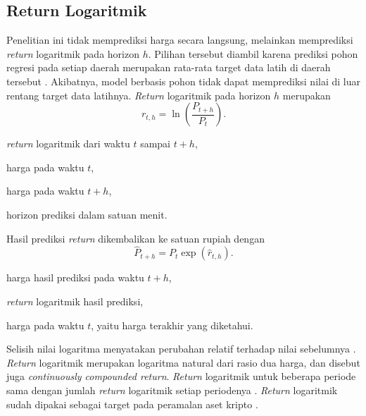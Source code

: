 \subsection{Return Logaritmik}
\label{subsec:return}
Penelitian ini tidak memprediksi harga secara langsung, melainkan memprediksi
\textit{return} logaritmik pada horizon $h$. Pilihan tersebut diambil karena
prediksi pohon regresi pada setiap daerah merupakan rata-rata target data latih
di daerah tersebut \cite{hastie2009}. Akibatnya, model berbasis pohon tidak
dapat memprediksi nilai di luar rentang target data latihnya.
\textit{Return} logaritmik pada horizon $h$ merupakan
\begin{equation}
  r_{t,h} = \ln\!\left(\frac{P_{t+h}}{P_t}\right).
  \label{eq:return}
\end{equation}
\begin{keterangan}
  \item[$r_{t,h}$] \textit{return} logaritmik dari waktu $t$ sampai $t+h$,
  \item[$P_t$] harga pada waktu $t$,
  \item[$P_{t+h}$] harga pada waktu $t+h$,
  \item[$h$] horizon prediksi dalam satuan menit.
\end{keterangan}
Hasil prediksi \textit{return} dikembalikan ke satuan rupiah dengan
\begin{equation}
  \hat{P}_{t+h} = P_t \exp\!\left(\hat{r}_{t,h}\right).
  \label{eq:konversi}
\end{equation}
\begin{keterangan}
  \item[$\hat{P}_{t+h}$] harga hasil prediksi pada waktu $t+h$,
  \item[$\hat{r}_{t,h}$] \textit{return} logaritmik hasil prediksi,
  \item[$P_t$] harga pada waktu $t$, yaitu harga terakhir yang diketahui.
\end{keterangan}
Selisih nilai logaritma menyatakan perubahan relatif terhadap nilai
sebelumnya \cite{hyndman2014fpp}.
\textit{Return} logaritmik merupakan logaritma natural dari rasio dua harga,
dan disebut juga \textit{continuously compounded return}. \textit{Return}
logaritmik untuk beberapa periode sama dengan jumlah \textit{return}
logaritmik setiap periodenya \cite{tsay2002}.
\textit{Return} logaritmik sudah dipakai sebagai target pada peramalan
aset kripto \cite{bouteska2024}.

